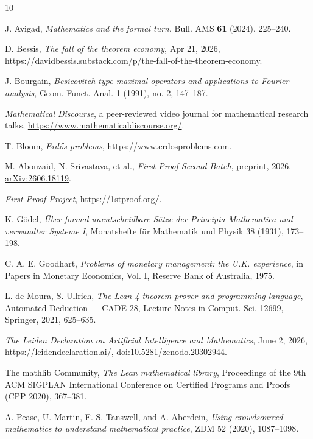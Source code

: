 \documentclass[12pt]{amsart}
\theoremstyle{definition}
\begin{document}
\begin{thebibliography}{10}

J. Avigad, \emph{Mathematics and the formal turn}, Bull. AMS \textbf{61} (2024), 225--240.

D. Bessis, \emph{The fall of the theorem economy}, Apr 21, 2026, \url{https://davidbessis.substack.com/p/the-fall-of-the-theorem-economy}.

J. Bourgain, \emph{Besicovitch type maximal operators and applications to Fourier analysis}, Geom. Funct. Anal. 1 (1991), no. 2, 147--187.

\emph{Mathematical Discourse}, a peer-reviewed video journal for mathematical research talks, \url{https://www.mathematicaldiscourse.org/}.

T. Bloom, \emph{Erd\H{o}s problems}, \url{https://www.erdosproblems.com}.

M. Abouzaid, N. Srivastava, et al., \emph{First Proof Second Batch}, preprint, 2026. \href{https://arxiv.org/abs/2606.18119}{arXiv:2606.18119}.

\emph{First Proof Project}, \url{https://1stproof.org/}.

K. G\"odel, \emph{\"Uber formal unentscheidbare S\"atze der Principia Mathematica und verwandter Systeme I}, Monatshefte f\"ur Mathematik und Physik 38 (1931), 173--198.

C. A. E. Goodhart, \emph{Problems of monetary management: the U.K. experience}, in Papers in Monetary Economics, Vol. I, Reserve Bank of Australia, 1975.

L. de Moura, S. Ullrich, \emph{The Lean 4 theorem prover and programming language}, Automated Deduction --- CADE 28, Lecture Notes in Comput. Sci. 12699, Springer, 2021, 625--635.

\emph{The Leiden Declaration on Artificial Intelligence and Mathematics}, June 2, 2026, \url{https://leidendeclaration.ai/}, \href{https://doi.org/10.5281/zenodo.20302944}{doi:10.5281/zenodo.20302944}.

The mathlib Community, \emph{The Lean mathematical library}, Proceedings of the 9th ACM SIGPLAN International Conference on Certified Programs and Proofs (CPP 2020), 367--381.

A. Pease, U. Martin, F. S. Tanswell, and A. Aberdein, \emph{Using crowdsourced mathematics to understand mathematical practice}, ZDM 52 (2020), 1087--1098.


\end{thebibliography}
\end{document}
